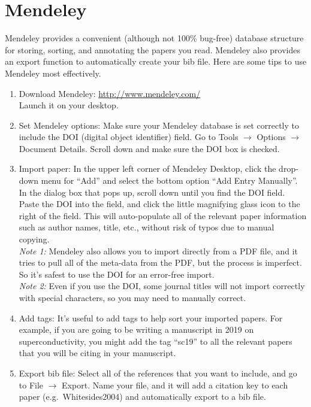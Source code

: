 \documentclass[aps,prb,twocolumn,superscriptaddress,floatfix,longbibliography]{revtex4-2}
\begin{document}
\appendix

\section{\label{app:Mendeley}Mendeley}

Mendeley provides a convenient (although not 100\% bug-free) database structure for storing, sorting, and annotating the papers you read. Mendeley also provides an export function to automatically create your bib file. Here are some tips to use Mendeley most effectively.
\begin{enumerate}
\item Download Mendeley: \url{http://www.mendeley.com/}\\ Launch it on your desktop.
\item Set Mendeley options: Make sure your Mendeley database is set correctly to include the DOI (digital object identifier) field. Go to Tools $\rightarrow$ Options $\rightarrow$ Document Details. Scroll down and make sure the DOI box is checked.
\item Import paper: In the upper left corner of Mendeley Desktop, click the drop-down menu for ``Add'' and select the bottom option ``Add Entry Manually''. In the dialog box that pops up, scroll down until you find the DOI field. Paste the DOI into the field, and click the little magnifying glass icon to the right of the field. This will auto-populate all of the relevant paper information such as author names, title, etc., without risk of typos due to manual copying.\\
    \textit{Note 1:} Mendeley also allows you to import directly from a PDF file, and it tries to pull all of the meta-data from the PDF, but the process is imperfect. So it's safest to use the DOI for an error-free import.\\
    \textit{Note 2:} Even if you use the DOI, some journal titles will not import correctly with special characters, so you may need to manually correct.
\item Add tags: It's useful to add tags to help sort your imported papers. For example, if you are going to be writing a manuscript in 2019 on superconductivity, you might add the tag ``sc19'' to all the relevant papers that you will be citing in your manuscript.
\item Export bib file: Select all of the references that you want to include, and go to File $\rightarrow$ Export.  Name your file, and it will add a citation key to each paper (e.g.\ Whitesides2004) and automatically export to a bib file.

\end{enumerate}
\end{document}
